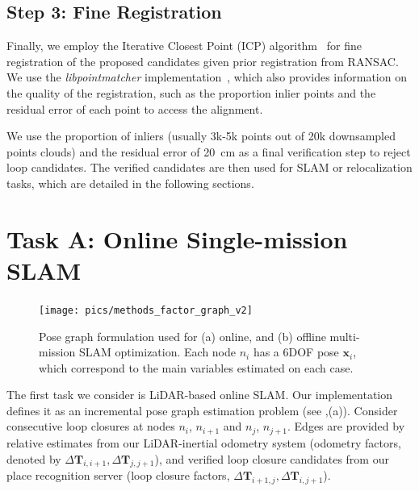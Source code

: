 \subsection*{\textbf{Step 3: Fine Registration}}
\label{subsubsec:fine-registration}
Finally, we employ the Iterative Closest Point (ICP) algorithm~\cite{besl1992icp} for fine registration of the proposed candidates given prior registration from RANSAC. We use the \emph{libpointmatcher} implementation~\cite{pomerleau2013iros}, which also provides information on the quality of the registration, such as the proportion inlier points and the residual error of each point to access the alignment.

We use the proportion of inliers (usually 3k-5k points out of 20k downsampled points clouds) and the residual error of \SI{20}{\centi\meter} as a final verification step to reject loop candidates. The verified candidates are then used for SLAM or relocalization tasks, which are detailed in the following sections.

\section{Task A: Online Single-mission SLAM} 
\label{sec:online_slam_mode}
\begin{figure}[t]
  \centering
  \texttt{[image: pics/methods\_factor\_graph\_v2]}
  \caption{Pose graph formulation used for (a) online, and (b) offline multi-mission SLAM optimization. Each node $n_{i}$ has a 6DOF pose $\mathbf{x}_{i}$, which correspond to the main variables estimated on each case.}
  \label{fig:factor_graph}
\end{figure}

The first task we consider is LiDAR-based online SLAM. Our implementation defines it as an incremental pose graph estimation problem (see ,(a)). Consider consecutive loop closures at nodes $n_{i}$, $n_{i+1}$ and $n_{j}$, $n_{j+1}$. Edges are provided by relative estimates from our LiDAR-inertial odometry system (odometry factors, denoted by $\Delta\mathbf{T}_{i,i+1}, \Delta\mathbf{T}_{j, j+1}$), and verified loop closure candidates from our place recognition server (loop closure factors, $\Delta\mathbf{T}_{i+1, j}, \Delta\mathbf{T}_{i, j+1}$).

